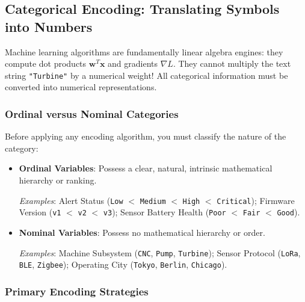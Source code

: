 \subsection{Categorical Encoding: Translating Symbols into Numbers}\label{subsec:feature_encoding}

Machine learning algorithms are fundamentally linear algebra engines: they compute dot products $\mathbf{w}^T \mathbf{x}$ and gradients $\nabla L$. They cannot multiply the text string \texttt{"Turbine"} by a numerical weight! All categorical information must be converted into numerical representations.

\subsubsection{Ordinal versus Nominal Categories}
Before applying any encoding algorithm, you must classify the nature of the category:
\begin{itemize}
    \item \textbf{Ordinal Variables}: Possess a clear, natural, intrinsic mathematical hierarchy or ranking.
    
    \textit{Examples}: Alert Status (\texttt{Low} $<$ \texttt{Medium} $<$ \texttt{High} $<$ \texttt{Critical}); Firmware Version (\texttt{v1} $<$ \texttt{v2} $<$ \texttt{v3}); Sensor Battery Health (\texttt{Poor} $<$ \texttt{Fair} $<$ \texttt{Good}).
    
    \item \textbf{Nominal Variables}: Possess no mathematical hierarchy or order.
    
    \textit{Examples}: Machine Subsystem (\texttt{CNC}, \texttt{Pump}, \texttt{Turbine}); Sensor Protocol (\texttt{LoRa}, \texttt{BLE}, \texttt{Zigbee}); Operating City (\texttt{Tokyo}, \texttt{Berlin}, \texttt{Chicago}).
\end{itemize}

\subsubsection{Primary Encoding Strategies}
